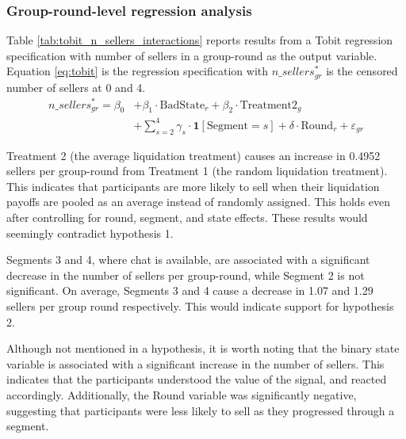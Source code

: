 \documentclass[11pt]{article}
\begin{document}
\subsubsection{Group-round-level regression analysis}
Table \ref{tab:tobit_n_sellers_interactions} reports results from a Tobit regression specification with number of sellers in a group-round as the output variable. Equation \ref{eq:tobit} is the regression specification with $n\_sellers^*_{gr}$ is the censored number of sellers at 0 and 4.
  \begin{equation}                                                                                                                                                              
  \begin{split}                                                                               
      n\_sellers^*_{gr} = \beta_0 &+ \beta_1 \cdot \text{BadState}_r + \beta_2 \cdot \text{Treatment2}_g \\                                                                           
      &+ \sum_{s=2}^{4} \gamma_s \cdot \mathbf{1}[\text{Segment} = s] + \delta \cdot \text{Round}_r + \varepsilon_{gr}
  \end{split}
  \label{eq:tobit}
  \end{equation}


Treatment 2 (the average liquidation treatment) causes an increase in 0.4952 sellers per group-round from Treatment 1 (the random liquidation treatment). This indicates that participants are more likely to sell when their liquidation payoffs are pooled as an average instead of randomly assigned. This holds even after controlling for round, segment, and state effects. These results would seemingly contradict hypothesis 1. 

Segments 3 and 4, where chat is available, are associated with a significant decrease in the number of sellers per group-round, while Segment 2 is not significant. On average, Segments 3 and 4 cause a decrease in 1.07 and 1.29 sellers per group round respectively. This would indicate support for hypothesis 2.


Although not mentioned in a hypothesis, it is worth noting that the binary state variable is associated with a significant increase in the number of sellers. This indicates that the participants understood the value of the signal, and reacted accordingly. Additionally, the Round variable was significantly negative, suggesting that participants were less likely to sell as they progressed through a segment.
\end{document}
